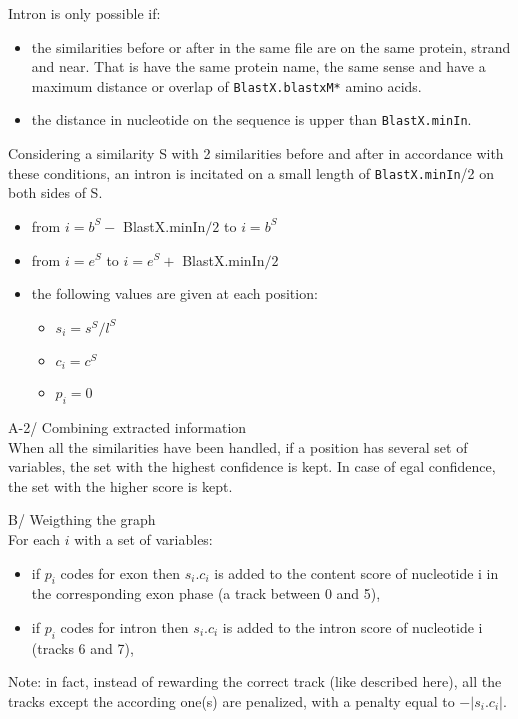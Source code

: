 Intron is only possible if:
\begin{itemize}
\item the similarities before or after in the same file are on the
  same protein, strand and near. That is have the same protein name,
  the same sense and have a maximum distance or overlap of
  \texttt{BlastX.blastxM*} amino acids.
\item the distance in nucleotide on the sequence is upper than
  \texttt{BlastX.minIn}.
\end{itemize}
Considering a similarity S with 2 similarities before and after in
accordance with these conditions, an intron is incitated on a small
length of \texttt{BlastX.minIn}/2 on both sides of S.
\begin{itemize}
\item from $i = b^S -$ BlastX.minIn$/2$ to $i = b^S$ 
\item from $i = e^S$ to $i = e^S +$ BlastX.minIn$/2$ 
\item the following values are given at each position:
  \begin{itemize}
  \item $s_i = s^S / l^S$ 
  \item $c_i = c^S$ 
  \item $p_i = 0$
  \end{itemize}
\end{itemize}

A-2/ Combining extracted information\\

When all the similarities have been handled, if a position has several
set of variables, the set with the highest confidence is kept. In
case of egal confidence, the set with the higher score is kept.

B/ Weigthing the graph\\

For each $i$ with a set of variables:
\begin{itemize}
\item if $p_i$ codes for exon then $s_i .c_i$ is added to the content
  score of nucleotide i in the corresponding exon phase (a track
  between 0 and 5),
\item if $p_i$ codes for intron then $s_i .c_i$ is added to the intron
  score of nucleotide i (tracks 6 and 7),
\end{itemize}

Note: in fact, instead of rewarding the correct track (like described
here), all the tracks except the according one(s) are penalized, with
a penalty equal to $-|s_i .c_i|$.

